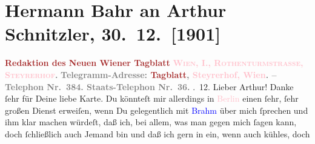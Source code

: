 

               \section[Hermann Bahr an Arthur Schnitzler, 30. 12. {[}1901{]}]{ Hermann Bahr an Arthur Schnitzler, 30. 12. {[}1901{]}}\nopagebreak{}\rehead{ }\normalsize\beginnumbering{} \toendnotes[C]{\smallbreak\pagebreak[2]} 
\toendnotes[C]{\smallbreak}\pstart
           \noindent{}\centering{}{\pb}\textcolor{gray}{\textbf{\textcolor{brown}{Redaktion des Neuen Wiener Tagblatt}{}\ledrightnote{\textcolor{brown}{Neues Wiener Tagblatt}}}}\pend
           \pstart
           \noindent{}\centering{}\textcolor{gray}{\textbf{\textsc{\textcolor{pink}{Wien, I., Rothenturmstrasse,
                        Steyrerhof}{}\ledrightnote{\textcolor{pink}{Steyrerhof}}.}}}\pend
           \pstart
           \noindent{}\centering{}\textcolor{gray}{\textbf{Telegramm-Adresse: \textcolor{brown}{Tagblatt}{}\ledrightnote{\textcolor{brown}{Neues Wiener Tagblatt}},
                        \textcolor{pink}{Steyrerhof, Wien}{}\ledrightnote{\textcolor{pink}{Steyrerhof}}. – Telephon Nr. 384.
                     Staats-Telephon Nr. 36.}}\pend
           . 12.\pend
           \pstart\center{}Lieber Arthur!\pend\pstart
           Danke ſehr für Deine liebe Karte. Du könnteſt mir allerdings in \textcolor{pink}{Berlin}{}\ledrightnote{\textcolor{pink}{Berlin}} einen ſehr, ſehr großen Dienst erweiſen, wenn Du
               gelegentlich mit \textcolor{blue}{Brahm}{}\ledrightnote{\textcolor{blue}{Otto Brahm}} über mich ſprechen und ihm
               klar machen würdeſt, daß ich, bei allem, was man gegen mich ſagen kann, doch
               ſchließlich auch Jemand bin und daß ich gern in ein, wenn auch kühles, doch
